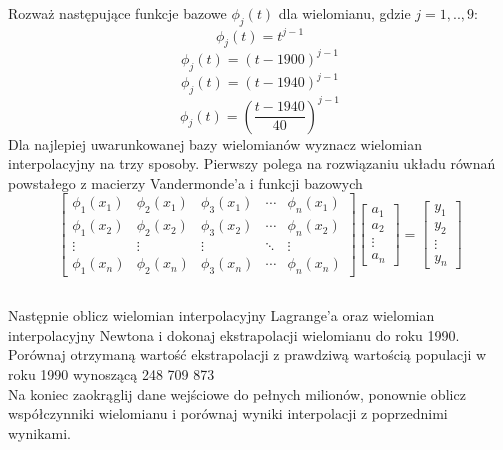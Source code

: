 \documentclass[11pt]{scrartcl}
\begin{document}
    \subsection*{}
    Rozważ następujące funkcje bazowe $\phi_j(t)$ dla wielomianu,
    gdzie $j=1,..,9$:
    \[
        \phi_j(t)=t^{j-1}
    \]
    \[
        \phi_j(t)=(t-1900)^{j-1}
    \]
    \[
        \phi_j(t)=(t-1940)^{j-1}
    \]
    \[
        \phi_j(t)=\left(\frac{t-1940}{40}\right)^{j-1}
    \]
    Dla najlepiej uwarunkowanej bazy wielomianów wyznacz wielomian
    interpolacyjny na trzy sposoby. Pierwszy polega na rozwiązaniu
    układu równań powstałego z macierzy Vandermonde'a i funkcji bazowych
    \[
        \begin{bmatrix}
            \phi_1(x_1) & \phi_2(x_1) & \phi_3(x_1) & \cdots &
            \phi_n(x_1) \\
            \phi_1(x_2) & \phi_2(x_2) & \phi_3(x_2) & \cdots &
            \phi_n(x_2) \\
            \vdots & \vdots & \vdots & \ddots & \vdots \\
            \phi_1(x_n) & \phi_2(x_n) & \phi_3(x_n) & \cdots &
            \phi_n(x_n)
        \end{bmatrix}
        \begin{bmatrix}
            a_1 \\
            a_2 \\
            \vdots \\
            a_n
        \end{bmatrix}
        =
        \begin{bmatrix}
            y_1 \\
            y_2 \\
            \vdots \\
            y_n
        \end{bmatrix}
    \]

    \subsection*{}
    Następnie oblicz wielomian interpolacyjny Lagrange'a oraz wielomian
    interpolacyjny Newtona i dokonaj ekstrapolacji wielomianu do
    roku 1990. Porównaj otrzymaną wartość ekstrapolacji z prawdziwą
    wartością populacji w roku 1990 wynoszącą 248 709 873 \\
    Na koniec zaokrąglij dane wejściowe do pełnych milionów, ponownie
    oblicz współczynniki wielomianu i porównaj wyniki interpolacji
    z poprzednimi wynikami.
\end{document}
